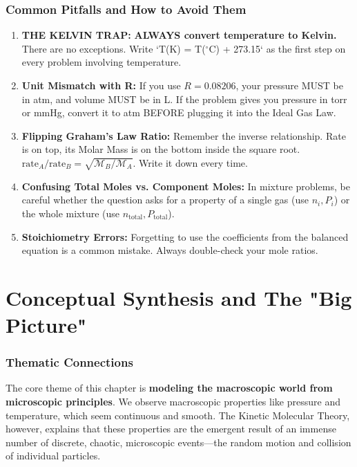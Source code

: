 \documentclass{article}
\begin{document}
\section{Common Pitfalls and How to Avoid Them}
\begin{enumerate}
    \item \textbf{THE KELVIN TRAP:} \textbf{ALWAYS convert temperature to Kelvin.} There are no exceptions. Write `T(K) = T($^\circ$C) + 273.15` as the first step on every problem involving temperature.
    \item \textbf{Unit Mismatch with R:} If you use $R=0.08206$, your pressure MUST be in atm, and volume MUST be in L. If the problem gives you pressure in torr or mmHg, convert it to atm BEFORE plugging it into the Ideal Gas Law.
    \item \textbf{Flipping Graham's Law Ratio:} Remember the inverse relationship. Rate is on top, its Molar Mass is on the bottom inside the square root. $\text{rate}_A/\text{rate}_B = \sqrt{\mathcal{M}_B/\mathcal{M}_A}$. Write it down every time.
    \item \textbf{Confusing Total Moles vs. Component Moles:} In mixture problems, be careful whether the question asks for a property of a single gas (use $n_i, P_i$) or the whole mixture (use $n_{\text{total}}, P_{\text{total}}$).
    \item \textbf{Stoichiometry Errors:} Forgetting to use the coefficients from the balanced equation is a common mistake. Always double-check your mole ratios.
\end{enumerate}

\part{Conceptual Synthesis and The "Big Picture"}

\section{Thematic Connections}
The core theme of this chapter is \textbf{modeling the macroscopic world from microscopic principles}. We observe macroscopic properties like pressure and temperature, which seem continuous and smooth. The Kinetic Molecular Theory, however, explains that these properties are the emergent result of an immense number of discrete, chaotic, microscopic events—the random motion and collision of individual particles.
\end{document}

